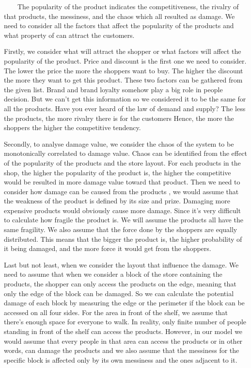 

\ \ \ \ The popularity of the product indicates the competitiveness, the rivalry of that products, the messiness, and the chaos which all resulted as damage. We need to consider all the factors that affect the popularity of the products and what property of can attract the customers. 
\newline

Firstly, we consider what will attract the shopper or what factors will affect the popularity of the product. Price and discount is the first one we need to consider. The lower the price the more the shoppers want to buy. The higher the discount the more they want to get this product. These two factors can be gathered from the given list. Brand and brand loyalty somehow play a big role in people decision. But we can't get this information so we considered it to be the same for all the products. Have you ever heard of the law of demand and supply? The less the products, the more rivalry there is for the customers Hence, the more the shoppers the higher the competitive tendency.
\newline

Secondly, to analyse damage value, we consider the chaos of the system to be monotonically correlated to damage value. Chaos can be identified from the effect of the popularity of the products and the store layout. For each products in the shop, the higher the popularity of the product is, the higher the competitive would be resulted in more damage value toward that product. Then we need to consider how damage can be caused from the products , we would assume that the weakness of the product is defined by its size and prize. Damaging more expensive products would obviously cause more damage. Since it's very difficult to calculate how fragile the product is. We will assume the products all have the same fragility. We also assume that the force done by the shoppers are equally distributed. This means that the bigger the product is, the higher probability of it being damaged, and the more force it would get from the shoppers.
\newline

Last but not least, when we consider the layout that influence the damage. We need to assume that when we consider a block of the store containing the products, the shopper can only access the products on the edge, meaning that only the edge of the block can be damaged. So we can calculate the potential damage of each block by measuring the edge or the perimeter if the block can be accessed on all four sides. For the area in front of the shelf, we assume that there's enough space for everyone to walk. In reality, only finite number of people standing in front of the shelf can access the products. However, in our model we would assume that every people in that area can access the products or in other words, can damage the products and we also assume that the messiness for the specific block is affected only by its own messiness and the ones adjacent to it.
\newline
